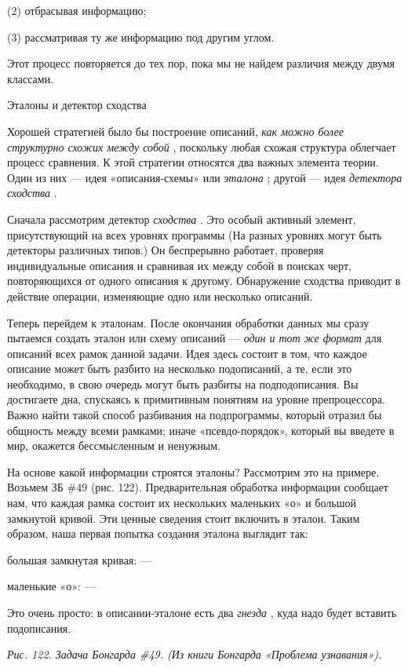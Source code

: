 \documentclass[../main.tex]{subfiles}
\begin{document}
(2) отбрасывая информацию;

(3) рассматривая ту же информацию под другим углом.

Этот процесс повторяется до тех пор, пока мы не найдем различия между двумя классами.

Эталоны и детектор сходства

Хорошей стратегией было бы построение описаний, \emph{как можно более структурно схожих между собой} , поскольку любая схожая структура облегчает процесс сравнения. К этой стратегии относятся два важных элемента теории. Один из них --- идея «описания-схемы» или \emph{эталона} ; другой --- идея \emph{детектора сходства} .

Сначала рассмотрим детектор \emph{сходства} . Это особый активный элемент, присутствующий на всех уровнях программы (На разных уровнях могут быть детекторы различных типов.) Он беспрерывно работает, проверяя индивидуальные описания и сравнивая их между собой в поисках черт, повторяющихся от одного описания к другому. Обнаружение сходства приводит в действие операции, изменяющие одно или несколько описаний.

Теперь перейдем к эталонам. После окончания обработки данных мы сразу пытаемся создать эталон или схему описаний --- \emph{один и тот же формат} для описаний всех рамок данной задачи. Идея здесь состоит в том, что каждое описание может быть разбито на несколько подописаний, а те, если это необходимо, в свою очередь могут быть разбиты на подподописания. Вы достигаете дна, спускаясь к примитивным понятиям на уровне препроцессора. Важно найти такой способ разбивания на подпрограммы, который отразил бы общность между всеми рамками; иначе «псевдо-порядок», который вы введете в мир, окажется бессмысленным и ненужным.

На основе какой информации строятся эталоны? Рассмотрим это на примере. Возьмем ЗБ \#49 (рис. 122). Предварительная обработка информации сообщает нам, что каждая рамка состоит их нескольких маленьких «о» и большой замкнутой кривой. Эти ценные сведения стоит включить в эталон. Таким образом, наша первая попытка создания эталона выглядит так:

большая замкнутая кривая: ---

маленькие «о»: ---

Это очень просто: в описании-эталоне есть два \emph{гнезда} , куда надо будет вставить подописания.

\emph{Рис. 122. Задача Бонгарда \#49. (Из книги Бонгарда «Проблема узнавания»).}
\end{document}
